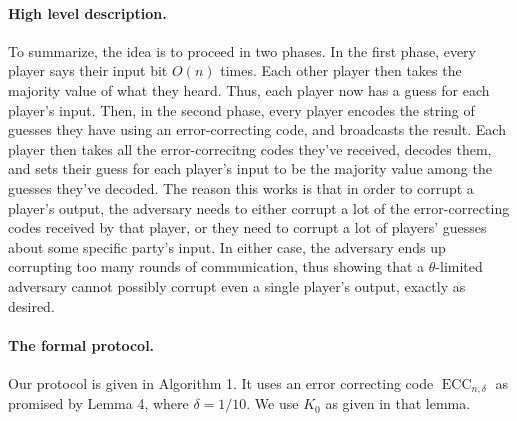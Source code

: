 \paragraph{High level description.} To summarize, the idea is to proceed in two phases. In the first phase, every player says their input bit $O(n)$ times. Each other player then takes the majority value of what they heard. Thus, each player now has a guess for each player's input. Then, in the second phase, every player encodes the string of guesses they have using an error-correcting code, and broadcasts the result. Each player then takes all the error-correcitng codes they've received, decodes them, and sets their guess for each player's input to be the majority value among the guesses they've decoded.
The reason this works is that in order to corrupt a player's output, the adversary needs to either corrupt a lot of the error-correcting codes received by that player, or they need to corrupt a lot of players' guesses about some specific party's input. In either case, the adversary ends up corrupting too many rounds of communication, thus showing that a $\theta$-limited adversary cannot possibly corrupt even a single player's output, exactly as desired.
\paragraph{The formal protocol.} Our protocol is given in Algorithm 1. It uses an error correcting code $\operatorname{ECC}_{n,\delta}$ as promised by Lemma 4, where $\delta=1/10$. We use $K_0$ as given in that lemma.
